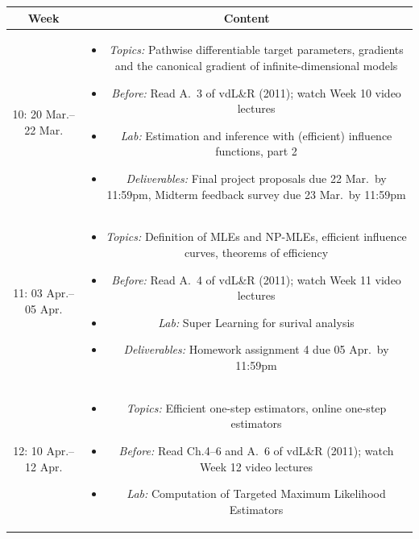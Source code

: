 \documentclass[11pt]{article}
\begin{document}
\newpage

\begin{table}[H]
\normalsize %
\begin{tabular}{ | c | c | }
\hline
\textbf{Week} & \textbf{Content} \\
\hline

10: 20 Mar.--22 Mar. & \begin{minipage}{.85\textwidth}
\begin{itemize} \itemsep-0.4em
  \vspace{1mm}
  \item \textit{Topics:} Pathwise differentiable target parameters, gradients
    and the canonical gradient of infinite-dimensional models
  \item \textit{Before:} Read A.~3 of vdL\&R (2011); watch Week 10 video
    lectures
  \item \textit{Lab:} Estimation and inference with (efficient) influence
    functions, part 2
  \item \textit{Deliverables:} Final project proposals due 22 Mar.~by 11:59pm,
    Midterm feedback survey due 23 Mar.~by 11:59pm
  \vspace{1mm}
\end{itemize}
\end{minipage} \\
\hline

11: 03 Apr.--05 Apr. & \begin{minipage}{.85\textwidth}
\begin{itemize} \itemsep-0.4em
  \vspace{1mm}
  \item \textit{Topics:} Definition of MLEs and NP-MLEs, efficient influence
    curves, theorems of efficiency
  \item \textit{Before:} Read A.~4 of vdL\&R (2011); watch Week 11 video
    lectures
  \item \textit{Lab:} Super Learning for surival analysis
  \item \textit{Deliverables:} Homework assignment 4 due 05 Apr.~by 11:59pm
  \vspace{1mm}
\end{itemize}
\end{minipage} \\
\hline

12: 10 Apr.--12 Apr. & \begin{minipage}{.85\textwidth}
\begin{itemize} \itemsep-0.4em
  \vspace{1mm}
  \item \textit{Topics:} Efficient one-step estimators, online one-step
    estimators
  \item \textit{Before:} Read Ch.4--6 and A.~6 of vdL\&R (2011); watch Week 12
    video lectures
  \item \textit{Lab:} Computation of Targeted Maximum Likelihood Estimators
  \vspace{1mm}
\end{itemize}
\end{minipage} \\
\hline


\end{tabular}
\end{table}
\end{document}
